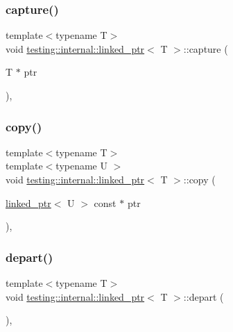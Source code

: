 \subsubsection{\texorpdfstring{capture()}{capture()}}
{\footnotesize\ttfamily template$<$typename T$>$ \\
void \mbox{\hyperlink{classtesting_1_1internal_1_1linked__ptr}{testing\+::internal\+::linked\+\_\+ptr}}$<$ T $>$\+::capture (\begin{DoxyParamCaption}\item[{T $\ast$}]{ptr }\end{DoxyParamCaption})\hspace{0.3cm}{\ttfamily [inline]}, {\ttfamily [private]}}

\mbox{\label{classtesting_1_1internal_1_1linked__ptr_aea2859970b65708fc4f7c8c4cbc7928a}} 
\subsubsection{\texorpdfstring{copy()}{copy()}}
{\footnotesize\ttfamily template$<$typename T$>$ \\
template$<$typename U $>$ \\
void \mbox{\hyperlink{classtesting_1_1internal_1_1linked__ptr}{testing\+::internal\+::linked\+\_\+ptr}}$<$ T $>$\+::copy (\begin{DoxyParamCaption}\item[{\mbox{\hyperlink{classtesting_1_1internal_1_1linked__ptr}{linked\+\_\+ptr}}$<$ U $>$ const $\ast$}]{ptr }\end{DoxyParamCaption})\hspace{0.3cm}{\ttfamily [inline]}, {\ttfamily [private]}}

\mbox{\label{classtesting_1_1internal_1_1linked__ptr_a0852ab20839140f29b2ad074339fccc7}} 
\subsubsection{\texorpdfstring{depart()}{depart()}}
{\footnotesize\ttfamily template$<$typename T$>$ \\
void \mbox{\hyperlink{classtesting_1_1internal_1_1linked__ptr}{testing\+::internal\+::linked\+\_\+ptr}}$<$ T $>$\+::depart (\begin{DoxyParamCaption}{ }\end{DoxyParamCaption})\hspace{0.3cm}{\ttfamily [inline]}, {\ttfamily [private]}}

